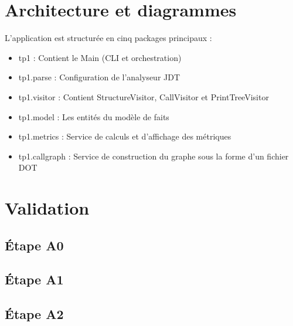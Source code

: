 \documentclass{Templates/customArticle}
\begin{document}
\section{Architecture et diagrammes}

L'application est structurée en cinq packages principaux :

\begin{itemize}
	\item tp1 : Contient le Main (CLI et orchestration)

	\item tp1.parse : Configuration de l'analyseur JDT

    \item tp1.visitor : Contient StructureVisitor, CallVisitor et PrintTreeVisitor

    \item tp1.model : Les entités du modèle de faits

    \item tp1.metrics : Service de calculs et d'affichage des métriques
    
    \item tp1.callgraph : Service de construction du graphe sous la forme d'un fichier DOT
\end{itemize}

\section{Validation}

\subsection{Étape A0}


\subsection{Étape A1}


\subsection{Étape A2}
\end{document}
